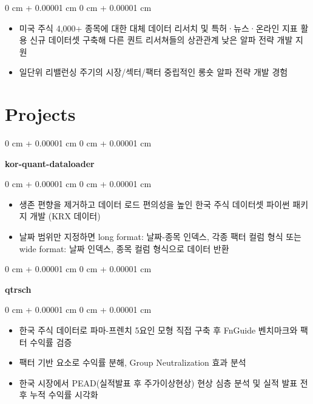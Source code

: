 \documentclass[10pt, letterpaper]{article}
\newenvironment{highlights}{
    \begin{itemize}[
        topsep=0.10 cm,
        parsep=0.10 cm,
        partopsep=0pt,
        itemsep=0pt,
        leftmargin=0 cm + 10pt
    ]
}{
    \end{itemize}
}
\newenvironment{onecolentry}{
    \begin{adjustwidth}{
        0 cm + 0.00001 cm
    }{
        0 cm + 0.00001 cm
    }
}{
    \end{adjustwidth}
}
\begin{document}
        \vspace{0.10 cm}
        \begin{onecolentry}
            \begin{highlights}
                \item 미국 주식 4,000+ 종목에 대한 대체 데이터 리서치 및 특허·뉴스·온라인 지표 활용 신규 데이터셋 구축해 다른 퀀트 리서쳐들의 상관관계 낮은 알파 전략 개발 지원
                \item 일단위 리밸런싱 주기의 시장/섹터/팩터 중립적인 롱숏 알파 전략 개발 경험
            \end{highlights}
        \end{onecolentry}



    
    \section{Projects}

        
        \begin{onecolentry}
            \textbf{kor-quant-dataloader}\end{onecolentry}

        \vspace{0.10 cm}
        \begin{onecolentry}
            \begin{highlights}
                \item 생존 편향을 제거하고 데이터 로드 편의성을 높인 한국 주식 데이터셋 파이썬 패키지 개발 (KRX 데이터)
                \item 날짜 범위만 지정하면 long format: 날짜-종목 인덱스, 각종 팩터 컬럼 형식 또는 wide format: 날짜 인덱스, 종목 컬럼 형식으로 데이터 반환
            \end{highlights}
        \end{onecolentry}


        \vspace{0.2 cm}

        \begin{onecolentry}
            \textbf{qtrsch}\end{onecolentry}

        \vspace{0.10 cm}
        \begin{onecolentry}
            \begin{highlights}
                \item 한국 주식 데이터로 파마-프렌치 5요인 모형 직접 구축 후 FnGuide 벤치마크와 팩터 수익률 검증
                \item 팩터 기반 요소로 수익률 분해, Group Neutralization 효과 분석
                \item 한국 시장에서 PEAD(실적발표 후 주가이상현상) 현상 심층 분석 및 실적 발표 전후 누적 수익률 시각화
            \end{highlights}
        \end{onecolentry}
\end{document}
